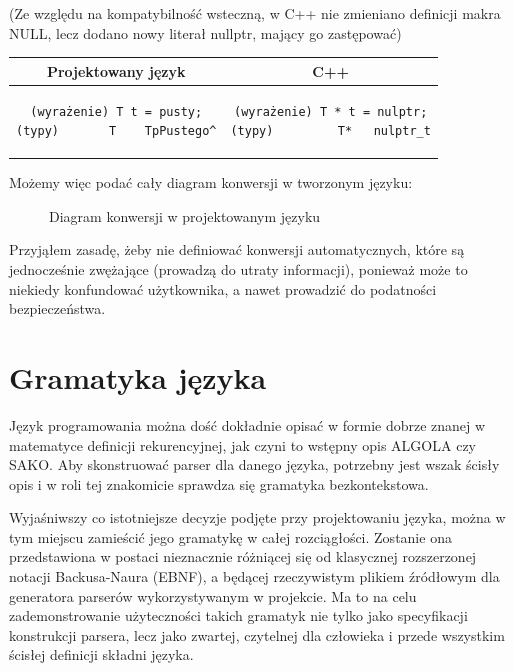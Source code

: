 (Ze względu na kompatybilność wsteczną, w C++ nie zmieniano definicji makra NULL, lecz dodano nowy literał nullptr, mający go zastępować)
\begin{center}
\begin{tabular}{|c|c|}
\hline
\textbf{Projektowany język} & \textbf{C++} \\ \hline
\begin{lstlisting}
(wyrażenie) T t = pusty;
(typy)       T    TpPustego^
\end{lstlisting}
& 
\begin{lstlisting}
(wyrażenie) T * t = nulptr;
(typy)         T*   nulptr_t
\end{lstlisting} \\\hline
\end{tabular}
\end{center}

Możemy więc podać cały diagram konwersji w tworzonym języku:

\begin{figure}[h]
    \centering
    
    \caption{Diagram konwersji w projektowanym języku}
\end{figure}

Przyjąłem zasadę, żeby nie definiować konwersji automatycznych, które są jednocześnie zwężające (prowadzą do utraty informacji), ponieważ może to niekiedy konfundować użytkownika, a nawet prowadzić do podatności bezpieczeństwa\cite[str.~260]{Reversing}.

\section{Gramatyka języka}
\label{sect:gramatyka}
Język programowania można dość dokładnie opisać w formie dobrze znanej w matematyce definicji rekurencyjnej, jak czyni to wstępny opis ALGOLA\cite{ALGOL_PRELIMINARY_REPORT} czy SAKO\cite{SAKO}. Aby skonstruować parser dla danego języka, potrzebny jest wszak ścisły opis i w roli tej znakomicie sprawdza się gramatyka bezkontekstowa.

Wyjaśniwszy co istotniejsze decyzje podjęte przy projektowaniu języka, można w tym miejscu zamieścić jego gramatykę w całej rozciągłości.
Zostanie ona przedstawiona w postaci nieznacznie różniącej się od klasycznej rozszerzonej notacji Backusa-Naura (EBNF), a będącej rzeczywistym plikiem źródłowym dla generatora parserów wykorzystywanym w projekcie. Ma to na celu zademonstrowanie użyteczności takich gramatyk nie tylko jako specyfikacji konstrukcji parsera, lecz jako zwartej, czytelnej dla człowieka i przede wszystkim ścisłej definicji składni języka.

